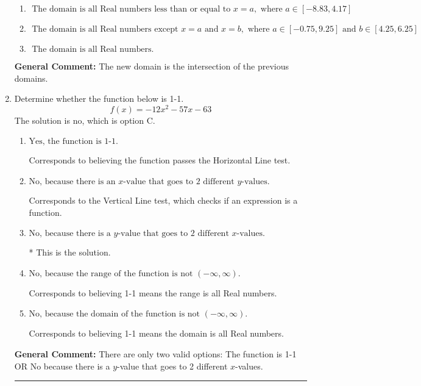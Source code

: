 \documentclass{extbook}[14pt]
\newcommand{\litem}[1]{\item #1

\rule{\textwidth}{0.4pt}}
\begin{document}
\begin{enumerate}
{\begin{enumerate}[label=\Alph*.]
\item \( \text{ The domain is all Real numbers less than or equal to } x = a, \text{ where } a \in [-8.83, 4.17] \)


\item \( \text{ The domain is all Real numbers except } x = a \text{ and } x = b, \text{ where } a \in [-0.75, 9.25] \text{ and } b \in [4.25, 6.25] \)


\item \( \text{ The domain is all Real numbers. } \)


\end{enumerate}

\textbf{General Comment:} The new domain is the intersection of the previous domains.
}
\litem{
Determine whether the function below is 1-1.
\[ f(x) = -12 x^2 - 57 x - 63 \]The solution is \( \text{no} \), which is option C.\begin{enumerate}[label=\Alph*.]
\item \( \text{Yes, the function is 1-1.} \)

Corresponds to believing the function passes the Horizontal Line test.
\item \( \text{No, because there is an $x$-value that goes to 2 different $y$-values.} \)

Corresponds to the Vertical Line test, which checks if an expression is a function.
\item \( \text{No, because there is a $y$-value that goes to 2 different $x$-values.} \)

* This is the solution.
\item \( \text{No, because the range of the function is not $(-\infty, \infty)$.} \)

Corresponds to believing 1-1 means the range is all Real numbers.
\item \( \text{No, because the domain of the function is not $(-\infty, \infty)$.} \)

Corresponds to believing 1-1 means the domain is all Real numbers.
\end{enumerate}

\textbf{General Comment:} There are only two valid options: The function is 1-1 OR No because there is a $y$-value that goes to 2 different $x$-values.
}
\end{enumerate}
\end{document}
